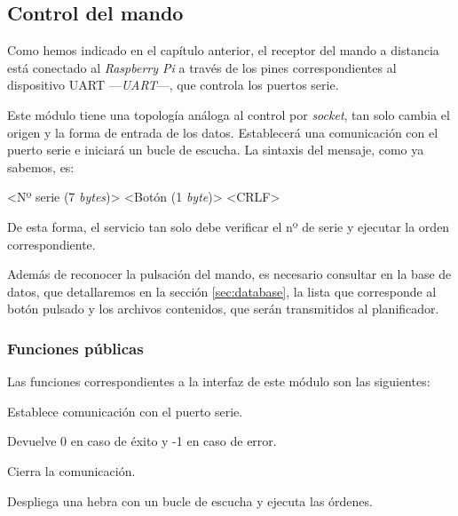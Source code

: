 \smallskip

\subsection{Control del mando}
\label{subsec:daemon_mando}

Como hemos indicado en el capítulo anterior, el receptor del mando a distancia está conectado al \textit{Raspberry Pi} a través de los pines correspondientes al dispositivo \acrshort{UART} ---\textit{\acrlong{UART}}---, que controla los puertos serie. \cite{wiki_uart}

Este módulo tiene una topología análoga al control por \textit{socket}, tan solo cambia el origen y la forma de entrada de los datos. Establecerá una comunicación con el puerto serie e iniciará un bucle de escucha. La sintaxis del mensaje, como ya sabemos, es:

\begin{center}
	<Nº serie (7 \textit{bytes})> <Botón (1 \textit{byte})> <CRLF>
\end{center}

De esta forma, el servicio tan solo debe verificar el nº de serie y ejecutar la orden correspondiente.

Además de reconocer la pulsación del mando, es necesario consultar en la base de datos, que detallaremos en la sección \ref{sec:database}, la lista que corresponde al botón pulsado y los archivos contenidos, que serán transmitidos al planificador.

\subsubsection{Funciones públicas}

Las funciones correspondientes a la interfaz de este módulo son las siguientes:

\begin{description}[style=nextline]
	\item[uart\_init () : \textit{integer}]
	Establece comunicación con el puerto serie.
	
	Devuelve 0 en caso de éxito y -1 en caso de error.
	
	\item[uart\_destroy ()]
	Cierra la comunicación.
	
	\item[uart\_loop ()]
	Despliega una hebra con un bucle de escucha y ejecuta las órdenes.
	
\end{description}

